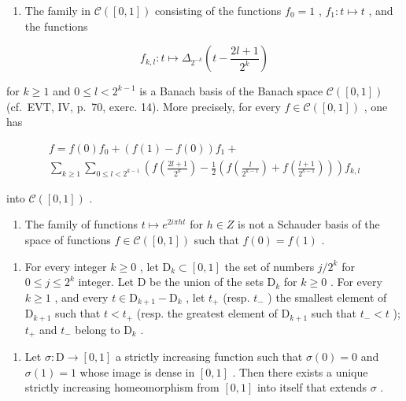 \begin{enumerate}
\def\labelenumi{\alph{enumi})}
\tightlist
\item
  The family in \(\mathcal{C}([0,1])\) consisting of the functions \(f_{0}=1\) , \(f_{1}:t\mapsto t\) , and the functions
\end{enumerate}

\[
f _ {k, l} \colon t \mapsto \Delta_ {2 ^ {- k}} \left(t - \frac {2 l + 1}{2 ^ {k}}\right)
\]

for \(k \geqslant 1\) and \(0 \leqslant l < 2^{k-1}\) is a Banach basis of the Banach space \(\mathcal{C}([0,1])\) (cf.~EVT, IV, p.~70, exerc. 14). More precisely, for every \(f \in \mathcal{C}([0,1])\) , one has

\[
\begin{array}{l} f = f (0) f _ {0} + (f (1) - f (0)) f _ {1} + \\ \sum_ {k \geqslant 1} \sum_ {0 \leqslant l <   2 ^ {k - 1}} \left(f \left(\frac {2 l + 1}{2 ^ {k}}\right) - \frac {1}{2} \left(f \left(\frac {l}{2 ^ {k - 1}}\right) + f \left(\frac {l + 1}{2 ^ {k - 1}}\right)\right)\right) f _ {k, l} \end{array}
\]

into \(\mathcal{C}([0,1])\) .

\begin{enumerate}
\def\labelenumi{\alph{enumi})}
\setcounter{enumi}{1}
\tightlist
\item
  The family of functions \(t \mapsto e^{2i\pi ht}\) for \(h \in Z\) is not a Schauder basis of the space of functions \(f \in \mathcal{C}([0,1])\) such that \(f(0) = f(1)\) .
\end{enumerate}

\begin{enumerate}
\def\labelenumi{\arabic{enumi})}
\setcounter{enumi}{45}
\tightlist
\item
  For every integer \(k \geqslant 0\) , let \(\mathrm{D}_k \subset [0,1]\) the set of numbers \(j/2^k\) for \(0 \leqslant j \leqslant 2^k\) integer. Let D be the union of the sets \(\mathrm{D}_k\) for \(k \geqslant 0\) . For every \(k \geqslant 1\) , and every \(t \in \mathrm{D}_{k+1} - \mathrm{D}_k\) , let \(t_+\) (resp. \(t_-\) ) the smallest element of \(\mathrm{D}_{k+1}\) such that \(t < t_+\) (resp. the greatest element of \(\mathrm{D}_{k+1}\) such that \(t_- < t\) ); \(t_+\) and \(t_-\) belong to \(\mathrm{D}_k\) .
\end{enumerate}

\begin{enumerate}
\def\labelenumi{\alph{enumi})}
\tightlist
\item
  Let \(\sigma\colon\mathrm{D}\to[0,1]\) a strictly increasing function such that \(\sigma(0)=0\) and \(\sigma(1)=1\) whose image is dense in \([0,1]\) . Then there exists a unique strictly increasing homeomorphism from \([0,1]\) into itself that extends \(\sigma\) .
\end{enumerate}

